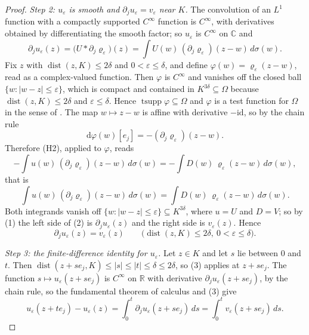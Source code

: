 \begin{proof}
\emph{Step 2: $u_\varepsilon$ is smooth and
$\partial_ju_\varepsilon=v_\varepsilon$ near $K$.}  The convolution of an
$L^{1}$ function with a compactly supported $C^\infty$ function is $C^\infty$,
with derivatives obtained by differentiating the smooth factor; so
$u_\varepsilon$ is $C^\infty$ on $\mathbb{C}$ and
\begin{equation}\tag{1}
  \partial_ju_\varepsilon(z)
  =\bigl(U*\partial_j\varrho_\varepsilon\bigr)(z)
  =\int U(w)\,(\partial_j\varrho_\varepsilon)(z-w)\,d\sigma(w).
\end{equation}
Fix $z$ with $\operatorname{dist}(z,K)\le2\delta$ and $0<\varepsilon\le\delta$,
and define $\varphi(w)=\varrho_\varepsilon(z-w)$, read as a complex-valued
function.  Then $\varphi$ is $C^\infty$ and vanishes off the closed ball
$\{w:|w-z|\le\varepsilon\}$, which is compact and contained in
$K^{3\delta}\subseteq\Omega$ because $\operatorname{dist}(z,K)\le2\delta$ and
$\varepsilon\le\delta$.  Hence $\operatorname{tsupp}\varphi\subseteq\Omega$ and
$\varphi$ is a test function for $\Omega$ in the sense of .
The map $w\mapsto z-w$ is affine with derivative $-\mathrm{id}$, so by the
chain rule
\[
  \mathrm{d}\varphi(w)[e_j]=-(\partial_j\varrho_\varepsilon)(z-w).
\]
Therefore (H2), applied to $\varphi$, reads
\[
  -\int u(w)\,(\partial_j\varrho_\varepsilon)(z-w)\,d\sigma(w)
  =-\int D(w)\,\varrho_\varepsilon(z-w)\,d\sigma(w),
\]
that is
\begin{equation}\tag{2}
  \int u(w)\,(\partial_j\varrho_\varepsilon)(z-w)\,d\sigma(w)
  =\int D(w)\,\varrho_\varepsilon(z-w)\,d\sigma(w).
\end{equation}
Both integrands vanish off $\{w:|w-z|\le\varepsilon\}\subseteq K^{3\delta}$,
where $u=U$ and $D=V$; so by (1) the left side of (2) is
$\partial_ju_\varepsilon(z)$ and the right side is $v_\varepsilon(z)$.  Hence
\begin{equation}\tag{3}
  \partial_ju_\varepsilon(z)=v_\varepsilon(z)
  \qquad\bigl(\operatorname{dist}(z,K)\le2\delta,\ 0<\varepsilon\le\delta\bigr).
\end{equation}

\emph{Step 3: the finite-difference identity for $u_\varepsilon$.}  Let
$z\in K$ and let $s$ lie between $0$ and $t$.  Then
$\operatorname{dist}(z+se_j,K)\le|s|\le|t|\le\delta\le2\delta$, so (3) applies
at $z+se_j$.  The function $s\mapsto u_\varepsilon(z+se_j)$ is $C^\infty$ on
$\mathbb{R}$ with derivative $\partial_ju_\varepsilon(z+se_j)$, by the chain
rule, so the fundamental theorem of calculus and (3) give
\begin{equation}\tag{4}
  u_\varepsilon(z+te_j)-u_\varepsilon(z)
  =\int_0^t\partial_ju_\varepsilon(z+se_j)\,ds
  =\int_0^tv_\varepsilon(z+se_j)\,ds .
\end{equation}


\end{proof}

